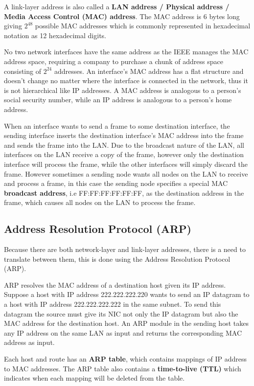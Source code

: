 \documentclass[12pt letter]{report}
\begin{document}
A link-layer address is also called a \textbf{LAN address / Physical
address / Media Access Control (MAC) address}. The MAC address is 6
bytes long giving $2^{48}$ possible MAC addresses which is commonly
represented in hexadecimal notation as 12 hexadecimal digits.

No two network interfaces have the same address as the IEEE manages
the MAC address space, requiring a company to purchase a chunk of
address space consisting of $2^{24}$ addresses. An interface's MAC
address has a flat structure and doesn't change no matter where the
interface is connected in the network, thus it is not hierarchical
like IP addresses. A MAC address is analogous to a person's social
security number, while an IP address is analogous to a person's home address.

When an interface wants to send a frame to some destination
interface, the sending interface inserts the destination interface's
MAC address into the frame and sends the frame into the LAN. Due to
the broadcast nature of the LAN, all interfaces on the LAN receive a
copy of the frame, however only the destination interface will
process the frame, while the other interfaces will simply discard the
frame. However sometimes a sending node wants all nodes on the LAN to
receive and process a frame, in this case the sending node specifies
a special MAC \textbf{broadcast address}, i.e FF:FF:FF:FF:FF:FF, as
the destination address in the frame, which causes all nodes on the
LAN to process the frame.

\subsection{Address Resolution Protocol (ARP)}

Because there are both network-layer and link-layer addresses, there
is a need to translate between them, this is done using the Address
Resolution Protocol (ARP).

ARP resolves the MAC address of a destination host given its IP
address. Suppose a host with IP address 222.222.222.220 wants to send
an IP datagram to a host with IP address 222.222.222.222 in the same
subnet. To send this datagram the source must give its NIC not only
the IP datagram but also the MAC address for the destination host. An
ARP module in the sending host takes any IP address on the same LAN
as input and returns the corresponding MAC address as input.

Each host and route has an \textbf{ARP table}, which contains
mappings of IP address to MAC addresses. The ARP table also contains
a \textbf{time-to-live (TTL)} which indicates when each mapping will
be deleted from the table.
\end{document}

